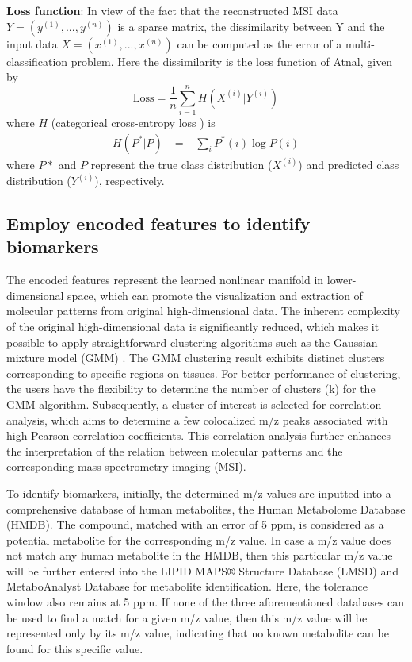 \documentclass[journal=jacsat,manuscript=article]{achemso}
\begin{document}
\textbf{Loss function}: In view of the fact that the reconstructed MSI data 
$Y = ( y^{(1)}, ..., y^{(n)})$ is a sparse matrix, 
the dissimilarity between Y and the input data $X=( x^{(1)}, ..., x^{(n)})$ 
can be computed as the error of a multi-classification problem. 
Here the dissimilarity is the loss function of Atnal, given by 
\begin{equation}
  \text{Loss} =\frac{1}{n} \sum_{i=1}^{n}H(X^{(i)}|Y^{(i)})
  \label{eqn:loss function}
\end{equation}
where $H$ (categorical cross-entropy loss 
 \cite{kingma2013auto}) is
\begin{equation}
  \begin{aligned}
    H(P^{*}|P) &= -\sum_{i}^{}P^{*}(i)\log P(i)      
  \end{aligned}
\end{equation}
where $P*$ and $P$ represent the true class distribution ($X^{(i)}$) and 
predicted class distribution ($Y^{(i)}$), respectively.

 
\subsection{Employ encoded features to identify biomarkers}
The encoded features represent the learned nonlinear manifold in 
lower-dimensional space, which can 
promote the visualization 
and extraction of molecular patterns from original high-dimensional data.
The inherent complexity of the 
original high-dimensional data is significantly reduced, which makes 
it possible to apply straightforward clustering algorithms such 
as the Gaussian-mixture 
model (GMM) \cite{reynolds2000speaker}. The GMM clustering result exhibits distinct 
clusters corresponding to specific regions on tissues. 
For better performance of clustering, the users have the flexibility to 
determine the number of clusters (k) for the GMM algorithm. 
Subsequently, a cluster of interest is selected for correlation 
analysis, which aims to determine a few colocalized m/z 
peaks associated with high Pearson correlation coefficients. 
This correlation analysis further enhances the interpretation of 
the relation between molecular patterns 
and the corresponding mass spectrometry imaging (MSI).

To identify biomarkers,  
initially, the determined m/z values are inputted into a 
comprehensive database of human metabolites, the Human 
Metabolome Database (HMDB). 
The compound, matched with an error of 5 ppm, is considered as a
potential metabolite for the corresponding m/z value. 
In case a m/z value does not match any human metabolite in the HMDB, 
then this particular m/z value will be further 
entered into the LIPID MAPS® Structure Database (LMSD) and 
MetaboAnalyst Database
for metabolite identification. Here, the tolerance window 
also remains at 5 ppm. 
If none of the three aforementioned databases 
can be used to find a match for a given m/z value, then this m/z 
value will be represented only by its m/z value, 
indicating that no known metabolite can be found for this specific value. 
\end{document}
